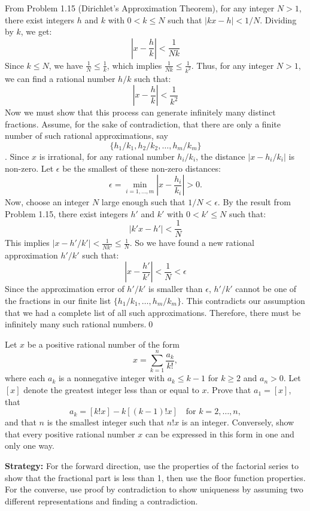 From Problem 1.15 (Dirichlet's Approximation Theorem), for any integer $N > 1$, there exist integers $h$ and $k$ with $0 < k \leq N$ such that $|kx - h| < 1/N$.
Dividing by $k$, we get:
\[
\left|x - \frac{h}{k}\right| < \frac{1}{Nk}
\]
Since $k \leq N$, we have $\frac{1}{N} \leq \frac{1}{k}$, which implies $\frac{1}{Nk} \leq \frac{1}{k^2}$.
Thus, for any integer $N>1$, we can find a rational number $h/k$ such that:
\[
\left|x - \frac{h}{k}\right| < \frac{1}{k^2}
\]
Now we must show that this process can generate infinitely many distinct fractions.
Assume, for the sake of contradiction, that there are only a finite number of such rational approximations, say $$\{h_1/k_1, h_2/k_2, \ldots, h_m/k_m\}$$.
Since $x$ is irrational, for any rational number $h_i/k_i$, the distance $|x - h_i/k_i|$ is non-zero. Let $\epsilon$ be the smallest of these non-zero distances:
\[
\epsilon = \min_{i=1,\dots,m} \left|x - \frac{h_i}{k_i}\right| > 0.
\]
Now, choose an integer $N$ large enough such that $1/N < \epsilon$.
By the result from Problem 1.15, there exist integers $h'$ and $k'$ with $0 < k' \leq N$ such that:
\[
|k'x - h'| < \frac{1}{N}
\]
This implies $|x - h'/k'| < \frac{1}{Nk'} \leq \frac{1}{N}$.
So we have found a new rational approximation $h'/k'$ such that:
\[
\left|x - \frac{h'}{k'}\right| < \frac{1}{N} < \epsilon
\]
Since the approximation error of $h'/k'$ is smaller than $\epsilon$, $h'/k'$ cannot be one of the fractions in our finite list $\{h_1/k_1, \ldots, h_m/k_m\}$. This contradicts our assumption that we had a complete list of all such approximations.
Therefore, there must be infinitely many such rational numbers.\qed


\begin{problembox}
Let $x$ be a positive rational number of the form
\[
x = \sum_{k=1}^n \frac{a_k}{k!},
\]
where each $a_k$ is a nonnegative integer with $a_k \leq k - 1$ for $k \geq 2$ and $a_n > 0$. Let $[x]$ denote the greatest integer less than or equal to $x$. Prove that $a_1 = [x]$, that
\[
a_k = [k!x] - k[(k - 1)!x] \quad \text{for } k = 2, \dots, n,
\]
and that $n$ is the smallest integer such that $n!x$ is an integer. Conversely, show that every positive rational number $x$ can be expressed in this form in one and only one way.
\end{problembox}

\noindent\textbf{Strategy:} For the forward direction, use the properties of the factorial series to show that the fractional part is less than 1, then use the floor function properties. For the converse, use proof by contradiction to show uniqueness by assuming two different representations and finding a contradiction.

